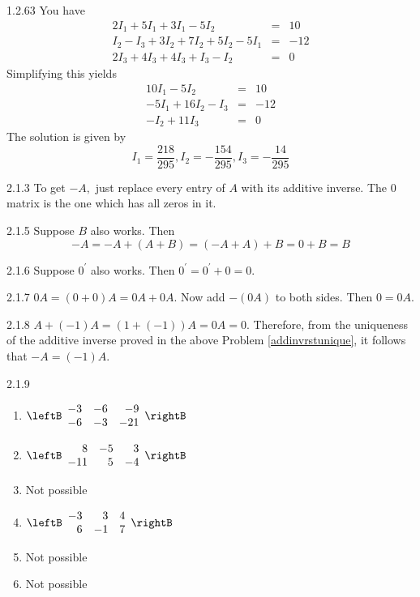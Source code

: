 \begin{Answer}{1.2.63}
You
have
\begin{eqnarray*}
2I_{1}+5I_{1}+3I_{1}-5I_{2} &=& 10 \\
I_{2}- I_{3} +3I_{2}+7I_{2}+5I_{2}-5I_{1}  &=&-12 \\
2I_{3}+4I_{3}+4I_{3}+I_{3}-I_{2} &=& 0
\end{eqnarray*}
Simplifying this yields
\begin{eqnarray*}
10I_{1}-5I_{2} &=& 10 \\
-5I_{1} + 16I_{2}- I_{3} &=&-12 \\
-I_{2} + 11I_{3} &=&0
\end{eqnarray*}
The solution is given by
\[
I_{1}=\frac{218}{295},I_{2}=-\frac{154}{295},I_{3}=-\frac{14}{295}
\]

\end{Answer}
\begin{Answer}{2.1.3}
To get $-A,$ just
replace every entry of $A$ with its additive inverse. The 0 matrix is the
one which has all zeros in it.
\end{Answer}
\begin{Answer}{2.1.5}
 Suppose $B$ also works. Then
\[
-A=-A+\left( A+B\right) =\left( -A+A\right) +B=0+B=B
\]
\end{Answer}
\begin{Answer}{2.1.6}
Suppose $0^{\prime }$ also works. Then $0^{\prime }=0^{\prime }+0=0.$
\end{Answer}
\begin{Answer}{2.1.7}
$0A=\left( 0+0\right) A=0A+0A.$ Now add $-\left(
0A\right) $ to both sides. Then $0=0A$.
\end{Answer}
\begin{Answer}{2.1.8}
$A+\left( -1\right) A=\left( 1+\left(
-1\right) \right) A=0A=0.$ Therefore, from the uniqueness of the additive
inverse proved in the above Problem \ref{addinvrstunique}, it follows that $
-A=\left( -1\right) A$.
\end{Answer}
\begin{Answer}{2.1.9}
\begin{enumerate}
\item $\leftB
\begin{array}{rrr}
-3 & -6 & -9 \\
-6 & -3 & -21
\end{array}
\rightB$
\item $\leftB
\begin{array}{rrr}
8 & -5 & 3 \\
-11 & 5 & -4
\end{array}
\rightB$
\item Not possible
\item $\leftB
\begin{array}{rrr}
-3 & 3 & 4 \\
6 & -1 & 7
\end{array}
\rightB$
\item Not possible
\item Not possible
\end{enumerate}
\end{Answer}
